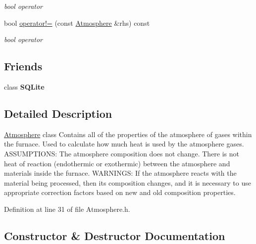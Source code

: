 \begin{DoxyCompactItemize}
\begin{DoxyCompactList}\small\item\em bool operator \end{DoxyCompactList}\item 
\mbox{\label{class_atmosphere_a8f75154e49eb74561dc9053607f502f9}} 
bool \hyperlink{class_atmosphere_a8f75154e49eb74561dc9053607f502f9}{operator!=} (const \hyperlink{class_atmosphere}{Atmosphere} \&rhs) const
\begin{DoxyCompactList}\small\item\em bool operator \end{DoxyCompactList}\end{DoxyCompactItemize}
\subsection*{Friends}
\begin{DoxyCompactItemize}
\item 
\mbox{\label{class_atmosphere_a0102f3b3c0cbf96db6c49f071fa5e7cc}} 
class {\bfseries S\+Q\+Lite}
\end{DoxyCompactItemize}


\subsection{Detailed Description}
\hyperlink{class_atmosphere}{Atmosphere} class Contains all of the properties of the atmosphere of gases within the furnace. Used to calculate how much heat is used by the atmosphere gases. A\+S\+S\+U\+M\+P\+T\+I\+O\+NS\+: The atmosphere composition does not change. There is not heat of reaction (endothermic or exothermic) between the atmosphere and materials inside the furnace. W\+A\+R\+N\+I\+N\+GS\+: If the atmosphere reacts with the material being processed, then its composition changes, and it is necessary to use appropriate correction factors based on new and old composition properties. 

Definition at line 31 of file Atmosphere.\+h.



\subsection{Constructor \& Destructor Documentation}
\mbox{\label{class_atmosphere_adbd727cfc7682d3b3b72a4fb101531f1}} 
